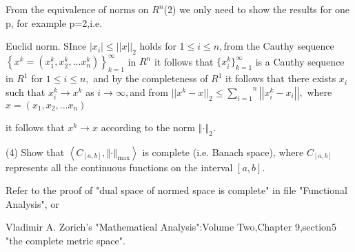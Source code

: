 \documentclass{article}
\begin{document}
From the equivalence of norms on $R^{n}$(2) we only need to show the results
for one p, for example p=2,i.e. 

Euclid norm. SInce $\left\vert x_{i}\right\vert \leq ||x||_{2}$ holds for  1$%
\leq i\leq n,$from the Cauthy sequence$\left\{ x^{k}=\left(
x_{1}^{k},x_{2}^{k},...x_{n}^{k}\right) \right\} _{k=1}^{\infty }$ in $R^{n}$
it follows that $\{x_{i}^{k}\}_{k=1}^{\infty }$ is a Cauthy sequence in $%
R^{1}$ for $1\leq i\leq n,$ and by the completeness of $R^{1}$ it follows
that there exists $x_{i}$ such that $x_{i}^{k}\rightarrow x^{k}$ as $%
i\rightarrow \infty ,$and from $||x^{k}-x||_{2}\leq \overset{n}{\underset{i=1%
}{\sum }}\left\vert \left\vert x_{i}^{k}-x_{i}\right\vert \right\vert ,$%
where $x=\left( x_{1},x_{2},...x_{n}\right) $

it follows that $x^{k}\rightarrow x$ according to the norm $\left\Vert \cdot
\right\Vert _{2}.$

(4) Show that $\left\langle C_{[a,b]},\left\Vert \cdot \right\Vert _{\max
}\right\rangle $ is complete (i.e. Banach space), where $C_{[a,b]}$
represents all the continuous functions on the interval $[a,b].$

Refer to the proof of "dual space of normed space is complete" in file
"Functional Analysis", or 

Vladimir A. Zorich's "Mathematical Analysis":Volume Two,Chapter 9,section5
"the complete metric space".
\end{document}
